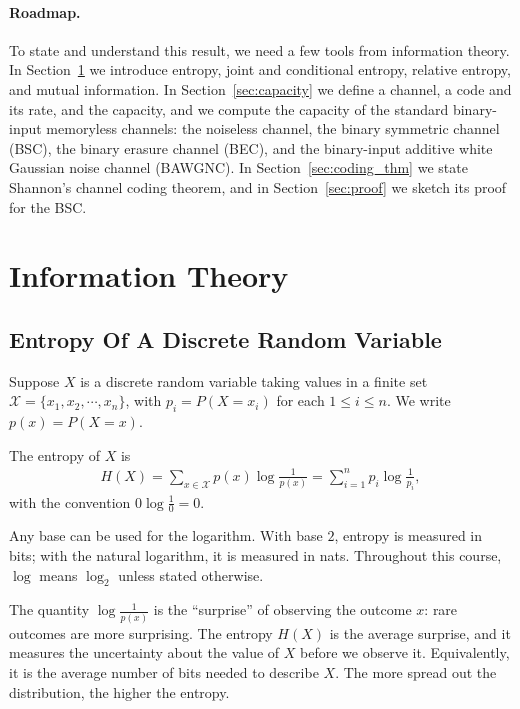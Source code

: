\paragraph{Roadmap.} To state and understand this result, we need a few tools from information theory. In Section~\ref{sec:infotheory} we introduce entropy, joint and conditional entropy, relative entropy, and mutual information. In Section~\ref{sec:capacity} we define a channel, a code and its rate, and the capacity, and we compute the capacity of the standard binary-input memoryless channels: the noiseless channel, the binary symmetric channel (BSC), the binary erasure channel (BEC), and the binary-input additive white Gaussian noise channel (BAWGNC). In Section~\ref{sec:coding_thm} we state Shannon's channel coding theorem, and in Section~\ref{sec:proof} we sketch its proof for the BSC.

\section{Information Theory}\label{sec:infotheory}
\subsection{Entropy Of A Discrete Random Variable}
Suppose \(X\) is a discrete random variable taking values in a finite set \(\mathcal{X} = \{x_1, x_2, \cdots, x_n\}\), with \(p_i = P(X=x_i)\) for each \(1 \leq i \leq n\). We write \(p(x) = P(X = x)\).
\begin{definition}
The entropy of \(X\) is
\begin{align}
    H(X) = \sum_{x \in \mathcal{X}} p(x) \log \frac{1}{p(x)} = \sum_{i=1}^{n} p_i \log \frac{1}{p_i},\label{eq:entropy}
\end{align}
with the convention \(0 \log \frac{1}{0} = 0\).
\end{definition}
Any base can be used for the logarithm. With base \(2\), entropy is measured in bits; with the natural logarithm, it is measured in nats. Throughout this course, \(\log\) means \(\log_2\) unless stated otherwise.

The quantity \(\log \frac{1}{p(x)}\) is the ``surprise'' of observing the outcome \(x\): rare outcomes are more surprising. The entropy \(H(X)\) is the average surprise, and it measures the uncertainty about the value of \(X\) before we observe it. Equivalently, it is the average number of bits needed to describe \(X\). The more spread out the distribution, the higher the entropy.

